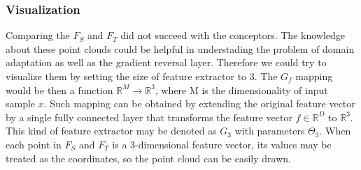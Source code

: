 \documentclass{article}
\begin{document}
\subsubsection{Visualization}
Comparing the $F_{S}$ and $F_{T}$ did not succeed with the conceptors. The knowledge about these point clouds could be helpful in understading the problem of domain adaptation as well as the gradient reversal layer. Therefore we could try to visualize them by setting the size of feature extractor to 3. The $G_{f}$ mapping would be then a function $\mathbb{R}^{M} \rightarrow \mathbb{R}^{3}$, where M is the dimensionality of input sample $x$. Such mapping can be obtained by extending the original feature vector by a single fully connected layer that transforms the feature vector $f \in \mathbb{R}^{D}$ to $\mathbb{R}^{3}$. This kind of feature extractor may be denoted as $G_{3}$ with parameters $\Theta_{3}$. When each point in $F_{S}$ and $F_{T}$ is a 3-dimensional feature vector, its values may be treated as the coordinates, so the point cloud can be easily drawn.
\end{document}
